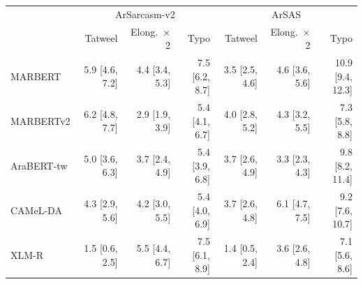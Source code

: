 \begin{tabular}{lrrrrrr}
\toprule
 & \multicolumn{3}{c}{ArSarcasm-v2} & \multicolumn{3}{c}{ArSAS} \\
 & Tatweel & Elong.\ $\times$2 & Typo & Tatweel & Elong.\ $\times$2 & Typo \\
\midrule
MARBERT & 5.9 {\scriptsize[4.6, 7.2]} & 4.4 {\scriptsize[3.4, 5.3]} & 7.5 {\scriptsize[6.2, 8.7]} & 3.5 {\scriptsize[2.5, 4.6]} & 4.6 {\scriptsize[3.6, 5.6]} & 10.9 {\scriptsize[9.4, 12.3]} \\
MARBERTv2 & 6.2 {\scriptsize[4.8, 7.7]} & 2.9 {\scriptsize[1.9, 3.9]} & 5.4 {\scriptsize[4.1, 6.7]} & 4.0 {\scriptsize[2.8, 5.2]} & 4.3 {\scriptsize[3.2, 5.5]} & 7.3 {\scriptsize[5.8, 8.8]} \\
AraBERT-tw & 5.0 {\scriptsize[3.6, 6.3]} & 3.7 {\scriptsize[2.4, 4.9]} & 5.4 {\scriptsize[3.9, 6.8]} & 3.7 {\scriptsize[2.6, 4.9]} & 3.3 {\scriptsize[2.3, 4.3]} & 9.8 {\scriptsize[8.2, 11.4]} \\
CAMeL-DA & 4.3 {\scriptsize[2.9, 5.6]} & 4.2 {\scriptsize[3.0, 5.5]} & 5.4 {\scriptsize[4.0, 6.9]} & 3.7 {\scriptsize[2.6, 4.8]} & 6.1 {\scriptsize[4.7, 7.5]} & 9.2 {\scriptsize[7.6, 10.7]} \\
XLM-R & 1.5 {\scriptsize[0.6, 2.5]} & 5.5 {\scriptsize[4.4, 6.7]} & 7.5 {\scriptsize[6.1, 8.9]} & 1.4 {\scriptsize[0.5, 2.4]} & 3.6 {\scriptsize[2.6, 4.8]} & 7.1 {\scriptsize[5.6, 8.6]} \\
\bottomrule
\end{tabular}
